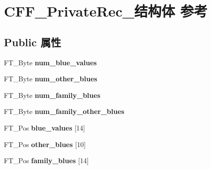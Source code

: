 \hypertarget{struct_c_f_f___private_rec__}{}\section{C\+F\+F\+\_\+\+Private\+Rec\+\_\+结构体 参考}
\label{struct_c_f_f___private_rec__}
\subsection*{Public 属性}
\begin{DoxyCompactItemize}
\item 
\mbox{\label{struct_c_f_f___private_rec___a0cb80c682054b8164c7acf80268f2129}} 
F\+T\+\_\+\+Byte {\bfseries num\+\_\+blue\+\_\+values}
\item 
\mbox{\label{struct_c_f_f___private_rec___a9b243fb3076cb047103f9e4cd4e97e92}} 
F\+T\+\_\+\+Byte {\bfseries num\+\_\+other\+\_\+blues}
\item 
\mbox{\label{struct_c_f_f___private_rec___a8fa5567b17831b3b9449c8866de46cdc}} 
F\+T\+\_\+\+Byte {\bfseries num\+\_\+family\+\_\+blues}
\item 
\mbox{\label{struct_c_f_f___private_rec___aa6896d394b3e2aaba96ae2938f515e13}} 
F\+T\+\_\+\+Byte {\bfseries num\+\_\+family\+\_\+other\+\_\+blues}
\item 
\mbox{\label{struct_c_f_f___private_rec___a892cbb15929f6abea66c011d62f7512e}} 
F\+T\+\_\+\+Pos {\bfseries blue\+\_\+values} \mbox{[}14\mbox{]}
\item 
\mbox{\label{struct_c_f_f___private_rec___a4c06566ee6e92c12d34b7d90025df5d6}} 
F\+T\+\_\+\+Pos {\bfseries other\+\_\+blues} \mbox{[}10\mbox{]}
\item 
\mbox{\label{struct_c_f_f___private_rec___aef7b2824e54944fcdf78ac1c78beb4c5}} 
F\+T\+\_\+\+Pos {\bfseries family\+\_\+blues} \mbox{[}14\mbox{]}
\item 
\mbox{\label{struct_c_f_f___private_rec___aa39535a2dca3a460e5150f3910443076}} 

\end{DoxyCompactItemize}
